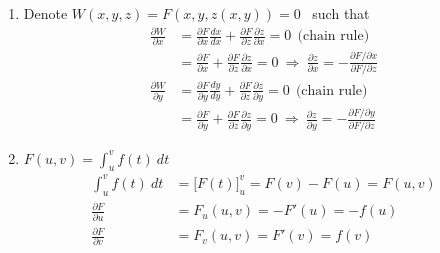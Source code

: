 \documentclass[12pt]{amsart}
\begin{document}
\begin{enumerate}
	\item Denote $W(x,y,z)=F(x,y,z(x,y))=0$ \ such that	
		\begin{align*}
			\frac{\partial W}{\partial x}&=\frac{\partial F}{\partial x}\frac{dx}{dx}+\frac{\partial F}{\partial z}\frac{\partial z}{\partial x}=0 \ \ \text{(chain rule)} \\
			&=\frac{\partial F}{\partial x}+\frac{\partial F}{\partial z}\frac{\partial z}{\partial x}=0 \ \Rightarrow \ \frac{\partial z}{\partial x}=-\frac{\partial F/\partial x}{\partial F/\partial z} \\
			\frac{\partial W}{\partial y}&=\frac{\partial F}{\partial y}\frac{dy}{dy}+\frac{\partial F}{\partial z}\frac{\partial z}{\partial y}=0 \ \ \text{(chain rule)} \\
			&=\frac{\partial F}{\partial y}+\frac{\partial F}{\partial z}\frac{\partial z}{\partial y}=0 \ \Rightarrow \ \frac{\partial z}{\partial y}=-\frac{\partial F/\partial y}{\partial F/\partial z}
			\end{align*}
				
	\item $F(u,v)=\int^v_u f(t) \ dt$
		\begin{align*}
			\int^v_u f(t) \ dt &= \Big[F(t)\Big]^v_u=F(v)-F(u)=F(u,v) \\
			\frac{\partial F}{\partial u}&=F_u(u,v)=-F'(u)=-f(u) \\
			\frac{\partial F}{\partial v}&=F_v(u,v)=F'(v)=f(v) 
		\end{align*}
					
\end{enumerate}
\end{document}
